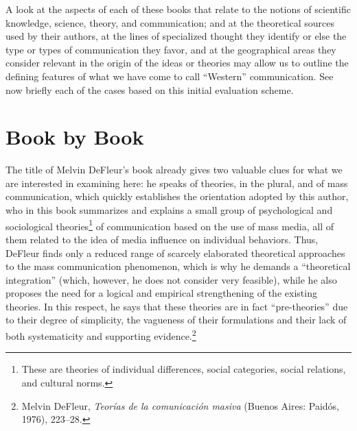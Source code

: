 \documentclass{tufte-handout}
\begin{document}
A look at the aspects of each of these books that relate to the notions
of scientific knowledge, science, theory, and communication; and at the
theoretical sources used by their authors, at the lines of specialized
thought they identify or else the type or types of communication they
favor, and at the geographical areas they consider relevant in the
origin of the ideas or theories may allow us to outline the defining
features of what we have come to call ``Western'' communication. See now
briefly each of the cases based on this initial evaluation scheme.

\hypertarget{book-by-book}{%
\section{Book by Book}\label{book-by-book}}

The title of Melvin DeFleur's book already gives two valuable clues for
what we are interested in examining here: he speaks of theories, in the
plural, and of mass communication, which quickly establishes the
orientation adopted by this author, who in this book summarizes and
explains a small group of psychological and sociological
theories\footnote{These are theories of individual differences, social
  categories, social relations, and cultural norms.} of communication
based on the use of mass media, all of them related to the idea of media
influence on individual behaviors. Thus, DeFleur finds only a reduced
range of scarcely elaborated theoretical approaches to the mass
communication phenomenon, which is why he demands a ``theoretical
integration'' (which, however, he does not consider very feasible),
while he also proposes the need for a logical and empirical
strengthening of the existing theories. In this respect, he says that
these theories are in fact ``pre-theories'' due to their degree of
simplicity, the vagueness of their formulations and their lack of both
systematicity and supporting evidence.\footnote{Melvin DeFleur,
  \emph{Teorías de la comunicación masiva} (Buenos Aires: Paidós, 1976),
  223--28.}
\end{document}
